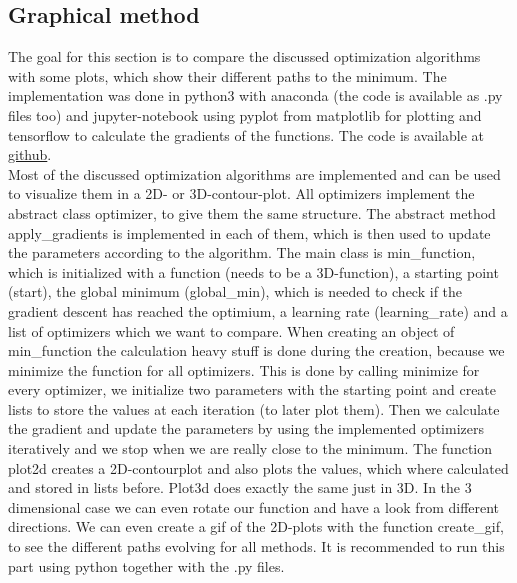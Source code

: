 \documentclass[aodsor,preprint]{imsart}
\numberwithin{equation}{section}
\theoremstyle{plain}
\begin{document}
\subsection{Graphical method}
The goal for this section is to compare the discussed optimization algorithms with some plots, which show their different paths to the minimum. The implementation was done in python3 with anaconda (the code is available as .py files too) and jupyter-notebook using pyplot from matplotlib for plotting and tensorflow to calculate the gradients of the functions. The code is available at \href{https://github.com/}{github}. \\
Most of the discussed optimization algorithms are implemented and can be used to visualize them in a 2D- or 3D-contour-plot. All optimizers implement the abstract class optimizer, to give them the same structure. The abstract method apply\_gradients is implemented in each of them, which is then used to update the parameters according to the algorithm. The main class is min\_function, which is initialized with a function (needs to be a 3D-function), a starting point (start), the global minimum (global\_min), which is needed to check if the gradient descent has reached the optimium, a learning rate (learning\_rate) and a list of optimizers which we want to compare. When creating an object of min\_function the calculation heavy stuff is done during the creation, because we minimize the function for all optimizers. This is done by calling minimize for every optimizer, we initialize two parameters with the starting point and create lists to store the values at each iteration (to later plot them). Then we calculate the gradient and update the parameters by using the implemented optimizers iteratively and we stop when we are really close to the minimum. The function plot2d creates a 2D-contourplot and also plots the values, which where calculated and stored in lists before. Plot3d does exactly the same just in 3D. In the 3 dimensional case we can even rotate our function and have a look from different directions. We can even create a gif of the 2D-plots with the function create\_gif, to see the different paths evolving for all methods. It is recommended to run this part using python together with the .py files.
\end{document}
